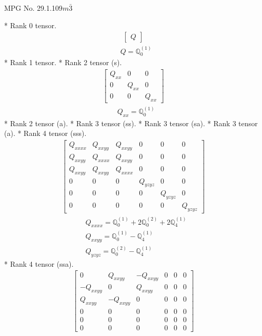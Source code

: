 \documentclass[fleqn,8pt,landscape]{jsarticle}
\begin{document}
\setcounter{MaxMatrixCols}{32}

\renewcommand{\tablename}{Table~}
\renewcommand{\figurename}{Figure~}
\begin{center}
\LARGE
MPG No. 29.1.109\quad$m\bar{3}$
\end{center}
* Rank 0 tensor.
\begin{align*}
\begin{bmatrix} Q \end{bmatrix}
\end{align*}
\begin{align*}
& Q = \mathbb{Q}_{0}^{(1)}
\end{align*}
* Rank 1 tensor.
* Rank 2 tensor (s).
\begin{align*}
\begin{bmatrix} Q_{xx} & 0 & 0 \\ 0 & Q_{xx} & 0 \\ 0 & 0 & Q_{xx} \end{bmatrix}
\end{align*}
\begin{align*}
& Q_{xx} = \mathbb{Q}_{0}^{(1)}
\end{align*}
* Rank 2 tensor (a).
* Rank 3 tensor (ss).
* Rank 3 tensor (sa).
* Rank 3 tensor (a).
* Rank 4 tensor (sss).
\begin{align*}
\begin{bmatrix} Q_{xxxx} & Q_{xxyy} & Q_{xxyy} & 0 & 0 & 0 \\ Q_{xxyy} & Q_{xxxx} & Q_{xxyy} & 0 & 0 & 0 \\ Q_{xxyy} & Q_{xxyy} & Q_{xxxx} & 0 & 0 & 0 \\ 0 & 0 & 0 & Q_{yzyz} & 0 & 0 \\ 0 & 0 & 0 & 0 & Q_{yzyz} & 0 \\ 0 & 0 & 0 & 0 & 0 & Q_{yzyz} \end{bmatrix}
\end{align*}
\begin{align*}
& Q_{xxxx} = \mathbb{Q}_{0}^{(1)} + 2 \mathbb{Q}_{0}^{(2)} + 2 \mathbb{Q}_{4}^{(1)} \\
& Q_{xxyy} = \mathbb{Q}_{0}^{(1)} - \mathbb{Q}_{4}^{(1)} \\
& Q_{yzyz} = \mathbb{Q}_{0}^{(2)} - \mathbb{Q}_{4}^{(1)}
\end{align*}
* Rank 4 tensor (ssa).
\begin{align*}
\begin{bmatrix} 0 & Q_{xxyy} & - Q_{xxyy} & 0 & 0 & 0 \\ - Q_{xxyy} & 0 & Q_{xxyy} & 0 & 0 & 0 \\ Q_{xxyy} & - Q_{xxyy} & 0 & 0 & 0 & 0 \\ 0 & 0 & 0 & 0 & 0 & 0 \\ 0 & 0 & 0 & 0 & 0 & 0 \\ 0 & 0 & 0 & 0 & 0 & 0 \end{bmatrix}
\end{align*}
\end{document}
